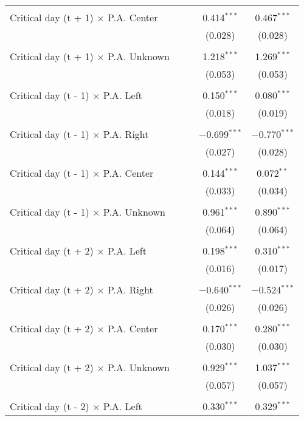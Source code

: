 \documentclass[
]{article}
\begin{document}
\begin{table}[!htbp]
{\begin{tabular}{@{\extracolsep{5pt}}lcccc}
  & & & & \\ 
 Critical day (t + 1) $\times$ P.A. Center &  &  & 0.414$^{***}$ & 0.467$^{***}$ \\ 
  &  &  & (0.028) & (0.028) \\ 
  & & & & \\ 
 Critical day (t + 1) $\times$ P.A. Unknown &  &  & 1.218$^{***}$ & 1.269$^{***}$ \\ 
  &  &  & (0.053) & (0.053) \\ 
  & & & & \\ 
 Critical day (t - 1) $\times$ P.A. Left &  &  & 0.150$^{***}$ & 0.080$^{***}$ \\ 
  &  &  & (0.018) & (0.019) \\ 
  & & & & \\ 
 Critical day (t - 1) $\times$ P.A. Right &  &  & $-$0.699$^{***}$ & $-$0.770$^{***}$ \\ 
  &  &  & (0.027) & (0.028) \\ 
  & & & & \\ 
 Critical day (t - 1) $\times$ P.A. Center &  &  & 0.144$^{***}$ & 0.072$^{**}$ \\ 
  &  &  & (0.033) & (0.034) \\ 
  & & & & \\ 
 Critical day (t - 1) $\times$ P.A. Unknown &  &  & 0.961$^{***}$ & 0.890$^{***}$ \\ 
  &  &  & (0.064) & (0.064) \\ 
  & & & & \\ 
 Critical day (t + 2) $\times$ P.A. Left &  &  & 0.198$^{***}$ & 0.310$^{***}$ \\ 
  &  &  & (0.016) & (0.017) \\ 
  & & & & \\ 
 Critical day (t + 2) $\times$ P.A. Right &  &  & $-$0.640$^{***}$ & $-$0.524$^{***}$ \\ 
  &  &  & (0.026) & (0.026) \\ 
  & & & & \\ 
 Critical day (t + 2) $\times$ P.A. Center &  &  & 0.170$^{***}$ & 0.280$^{***}$ \\ 
  &  &  & (0.030) & (0.030) \\ 
  & & & & \\ 
 Critical day (t + 2) $\times$ P.A. Unknown &  &  & 0.929$^{***}$ & 1.037$^{***}$ \\ 
  &  &  & (0.057) & (0.057) \\ 
  & & & & \\ 
 Critical day (t - 2) $\times$ P.A. Left &  &  & 0.330$^{***}$ & 0.329$^{***}$ \\ 

\end{tabular}}
\end{table}
\end{document}
